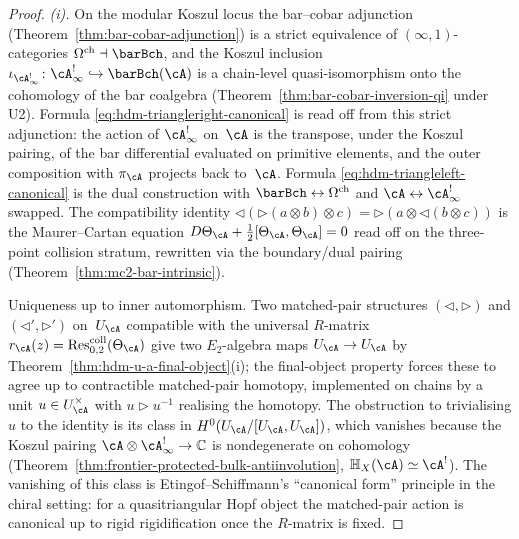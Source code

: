 \begin{proof}
\emph{(i).} On the modular Koszul locus the bar--cobar adjunction
(Theorem~\ref{thm:bar-cobar-adjunction}) is a strict equivalence of
$(\infty,1)$-categories
$\Omega^{\mathrm{ch}}\dashv \barBch$, and the Koszul
inclusion $\iota_{\cA^!_\infty}\colon\cA^!_\infty\hookrightarrow
\barBch(\cA)$ is a chain-level quasi-isomorphism onto the
cohomology of the bar coalgebra
(Theorem~\ref{thm:bar-cobar-inversion-qi} under U2). Formula
\eqref{eq:hdm-triangleright-canonical} is read off from this strict
adjunction: the action of $\cA^!_\infty$ on~$\cA$ is the transpose,
under the Koszul pairing, of the bar differential evaluated on
primitive elements, and the outer composition with $\pi_\cA$ projects
back to~$\cA$. Formula
\eqref{eq:hdm-triangleleft-canonical} is the dual construction with
$\barBch\leftrightarrow\Omega^{\mathrm{ch}}$ and
$\cA\leftrightarrow\cA^!_\infty$ swapped. The compatibility
identity
$\triangleleft(\triangleright(a\otimes b)\otimes c)
=\triangleright(a\otimes\triangleleft(b\otimes c))$
is the Maurer--Cartan equation
$D\Theta_\cA+\tfrac12[\Theta_\cA,\Theta_\cA]=0$ read off on the
three-point collision stratum, rewritten via the boundary/dual
pairing (Theorem~\ref{thm:mc2-bar-intrinsic}).

Uniqueness up to inner automorphism. Two matched-pair structures
$(\triangleleft,\triangleright)$ and
$(\triangleleft',\triangleright')$ on~$U_\cA$ compatible with the
universal $R$-matrix
$r_\cA(z)=\mathrm{Res}^{\mathrm{coll}}_{0,2}(\Theta_\cA)$ give two
$E_2$-algebra maps $U_\cA\to U_\cA$ by
Theorem~\ref{thm:hdm-u-a-final-object}(i); the final-object property
forces these to agree up to contractible matched-pair homotopy,
implemented on chains by a unit
$u\in U_\cA^\times$ with $u\triangleright u^{-1}$ realising the
homotopy. The obstruction to trivialising $u$ to the identity is its
class in $H^0(U_\cA/[U_\cA,U_\cA])$, which vanishes because the
Koszul pairing $\cA\otimes\cA^!_\infty\to\mathbb C$ is nondegenerate
on cohomology (Theorem~\ref{thm:frontier-protected-bulk-antiinvolution},
$\mathbb H_X(\cA)\simeq\cA^!$). The vanishing of this class is
Etingof--Schiffmann's ``canonical form'' principle
\cite[§3]{EtingofSchiffmann} in the chiral setting: for a
quasitriangular Hopf object the matched-pair action is canonical up
to rigid rigidification once the $R$-matrix is fixed.


\end{proof}

